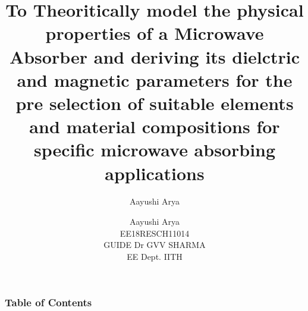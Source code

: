 \documentclass[11pt,aspect ratio=169]{beamer}
\begin{document}
	
	\author{Aayushi Arya}
	  
	\title{To Theoritically model the  physical properties of a Microwave Absorber and  deriving its dielctric and magnetic parameters  for the pre selection of suitable elements and material compositions for specific microwave absorbing  applications}
		\author{\scriptsize Aayushi Arya\\
		EE18RESCH11014\\
	GUIDE Dr GVV SHARMA
\\EE Dept. IITH}




	\begin{frame}[t]
		\maketitle
	\end{frame}
\begin{frame}
	\frametitle{Table of Contents}
	\tableofcontents
	\end{frame}
\end{document}
